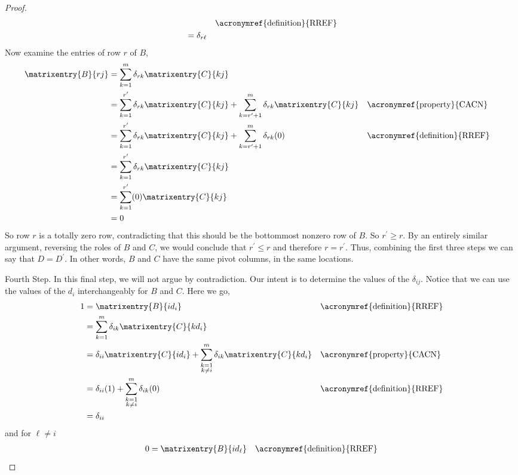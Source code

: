 \begin{proof}
\begin{align*}
&&\text{\acronymref{definition}{RREF}}\\
%
&=\delta_{r\ell}
%
\end{align*}
%
Now examine the entries of row $r$ of $B$,
%
\begin{align*}
\matrixentry{B}{rj}
&=\sum_{k=1}^{m}\delta_{rk}\matrixentry{C}{kj}\\
%
&=
\sum_{k=1}^{r^\prime}\delta_{rk}\matrixentry{C}{kj}
+
\sum_{k=r^\prime+1}^{m}\delta_{rk}\matrixentry{C}{kj}
&&\text{\acronymref{property}{CACN}}\\
%
&=
\sum_{k=1}^{r^\prime}\delta_{rk}\matrixentry{C}{kj}
+
\sum_{k=r^\prime+1}^{m}\delta_{rk}(0)
&&\text{\acronymref{definition}{RREF}}\\
%
&=\sum_{k=1}^{r^\prime}\delta_{rk}\matrixentry{C}{kj}\\
%
&=\sum_{k=1}^{r^\prime}(0)\matrixentry{C}{kj}\\
%
&=0
\end{align*}
%
So row $r$ is a totally zero row, contradicting that this should be the bottommost nonzero row of $B$.  So $r^\prime\geq r$.  By an entirely similar argument, reversing the roles of $B$ and $C$, we would conclude that $r^\prime\leq r$ and therefore $r=r^\prime$.  Thus, combining the first three steps we can say that $D=D^\prime$.  In other words, $B$ and $C$ have the same pivot columns, in the same locations.\par
%
Fourth Step.  In this final step, we will not argue by contradiction.  Our intent is to determine the values of the $\delta_{ij}$.  Notice that we can use the values of the $d_i$ interchangeably for $B$ and $C$.  Here we go,
%
\begin{align*}
1
&=\matrixentry{B}{id_i}
&&\text{\acronymref{definition}{RREF}}\\
%
&=\sum_{k=1}^{m}\delta_{ik}\matrixentry{C}{kd_i}\\
%
&=
\delta_{ii}\matrixentry{C}{id_i}
+
\sum_{\substack{k=1\\k\neq i}}^{m}\delta_{ik}\matrixentry{C}{kd_i}
&&\text{\acronymref{property}{CACN}}\\
%
&=
\delta_{ii}(1)
+
\sum_{\substack{k=1\\k\neq i}}^{m}\delta_{ik}(0)
&&\text{\acronymref{definition}{RREF}}\\
%
&=\delta_{ii}
%
\end{align*}
%
and for $\ell\neq i$
%
\begin{align*}
0
&=\matrixentry{B}{id_\ell}
&&\text{\acronymref{definition}{RREF}}\\

\end{align*}
\end{proof}
